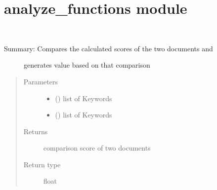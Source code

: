 \documentclass[letterpaper,10pt,english]{sphinxmanual}
\begin{document}
\section{analyze\_functions module}
\label{\detokenize{functionsv1:analyze-functions-module}}\label{\detokenize{functionsv1:module-analyze_functions}}

\begin{fulllineitems}
\label{\detokenize{functionsv1:analyze_functions.calculatecomparisonscore}}~\begin{description}
\item[{Summary: Compares the calculated scores of the two documents and }] \leavevmode
generates value based on that comparison

\end{description}
\begin{quote}\begin{description}
\item[{Parameters}] \leavevmode\begin{itemize}
\item {} 
 ({\hyperref[\detokenize{KeywordList:module-KeywordList}]{}}) \textendash{} list of Keywords

\item {} 
 ({\hyperref[\detokenize{KeywordList:module-KeywordList}]{}}) \textendash{} list of Keywords

\end{itemize}

\item[{Returns}] \leavevmode
comparison score of two documents

\item[{Return type}] \leavevmode
float

\end{description}\end{quote}

\end{fulllineitems}

\end{document}
